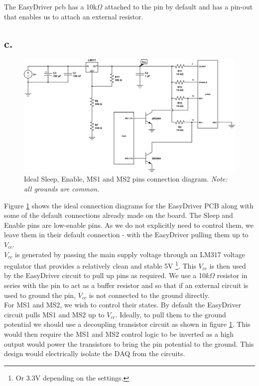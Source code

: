 \documentclass{article}
\theoremstyle{plain}
\theoremstyle{definition}
\theoremstyle{remark}
\begin{document}
The EasyDriver pcb has a 10k$\Omega$ attached to the pin by default and has a pin-out that enables us to attach an external resistor. 

\clearpage

\subsection*{c.}
\begin{figure}[htb]
\begin{center}
\includegraphics[width = 18cm]{lab5_q1_c.png}
\caption{Ideal Sleep, Enable, MS1 and MS2 pins connection diagram. \emph{Note: all grounds are common.}}
\label{q1_c}
\end{center}
\end{figure}

Figure \ref{q1_c} shows the ideal connection diagrams for the EasyDriver PCB along with some of the default connections already made on the board. The Sleep and Enable pins are low-enable pins. As we do not explicitly need to control them, we leave them in their default connection - with the EasyDriver pulling them up to $V_{cc}$.\\

$V_{cc}$ is generated by passing the main supply voltage through an LM317 voltage regulator that provides a relatively clean and stable 5V \footnote{Or 3.3V depending on the settings.}. This $V_{cc}$ is then used by the EasyDriver circuit to pull up pins as required. We use a 10$k\Omega$ resistor in series with the pin to act as a buffer resistor and so that if an external circuit is used to ground the pin, $V_{cc}$ is not connected to the ground directly.\\

For MS1 and MS2, we wish to control their states. By default the EasyDriver circuit pulls MS1 and MS2 up to $V_{cc}$. Ideally, to pull them to the ground potential we should use a decoupling transistor circuit as shown in figure \ref{q1_c}. This would then require the MS1 and MS2 control logic to be inverted as a high output would power the transistors to bring the pin potential to the ground. This design would electrically isolate the DAQ from the circuits.\\
\end{document}
